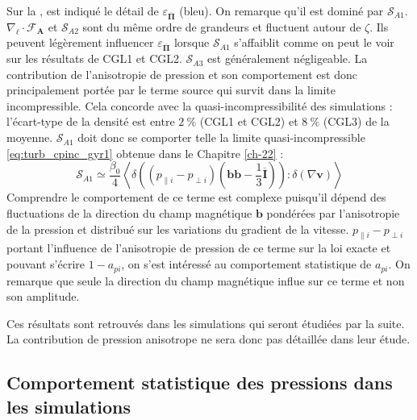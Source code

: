 Sur la , est indiqué le détail de $\varepsilon_{\overline{\boldsymbol{\Pi}}}$ (bleu). On remarque qu'il est dominé par $\mathcal{S}_{A1}$. $\nabla_{\boldsymbol{\ell}} \cdot \boldsymbol{\mathcal{F}_A}$ et $\mathcal{S}_{A2}$ sont du même ordre de grandeurs et fluctuent autour de $\zeta$. Ils peuvent légèrement influencer $\varepsilon_{\overline{\boldsymbol{\Pi}}}$ lorsque $\mathcal{S}_{A1}$ s'affaiblit comme on peut le voir sur les résultats de CGL1 et CGL2. $\mathcal{S}_{A3}$ est généralement négligeable. La contribution de l'anisotropie de pression et son comportement est donc principalement portée par le terme source qui survit dans la limite incompressible. Cela concorde avec la quasi-incompressibilité des simulations : l'écart-type de la densité est entre $\SI{2}{\%}$ (CGL1 et CGL2) et $\SI{8}{\%}$ (CGL3) de la moyenne. $\mathcal{S}_{A1}$ doit donc se comporter telle la limite quasi-incompressible \eqref{eq:turb_cpinc_gyr1} obtenue dans le Chapitre \ref{ch-22} : 
\begin{equation}
    \mathcal{S}_{A1} \simeq \frac{\beta_0}{4}  \left< \delta \left(\left(p_{\parallel i } - p_{\perp i }\right)\left( \boldsymbol{b} \boldsymbol{b} - \frac{1}{3}  \overline{\boldsymbol{I}} \right) \right):\delta \left(\nabla \boldsymbol{v} \right)\right>
\end{equation}
Comprendre le comportement de ce terme est complexe puisqu'il dépend des fluctuations de la direction du champ magnétique $\boldsymbol{b}$ pondérées par l'anisotropie de la pression et distribué sur les variations du gradient de la vitesse. $p_{\parallel i } - p_{\perp i }$ portant l'influence de l'anisotropie de pression de ce terme sur la loi exacte et pouvant s'écrire $1-a_{pi}$, on s'est intéressé au comportement statistique de $a_{pi}$. On remarque que seule la direction du champ magnétique influe sur ce terme et non son amplitude.

Ces résultats sont retrouvés dans les simulations qui seront étudiées par la suite. La contribution de pression anisotrope ne sera donc pas détaillée dans leur étude. 

\subsection{Comportement statistique des pressions dans les simulations}

